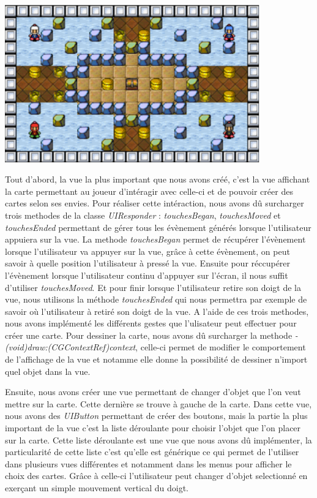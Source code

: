 		\begin{center}
			\includegraphics[width=11cm]{./Developpement/Img/carte.eps}
		\end{center}
		Tout d'abord, la vue la plus important que nous avons créé, c'est la vue affichant la carte permettant au joueur d'intéragir avec celle-ci et de pouvoir créer des cartes selon ses envies. Pour réaliser cette intéraction, nous avons dû surcharger trois methodes de la classe \textit{UIResponder} : \textit{touchesBegan}, \textit{touchesMoved} et \textit{touchesEnded} permettant de gérer tous les évènement générés lorsque l'utilisateur appuiera sur la vue. La methode \textit{touchesBegan} permet de récupérer l'évènement lorsque l'utilisateur va appuyer sur la vue, grâce à cette évènement, on peut savoir à quelle position l'utilisateur à pressé la vue. Ensuite pour réccupérer l'évènement lorsque l'utilisateur continu d'appuyer sur l'écran, il nous suffit d'utiliser \textit{touchesMoved}. Et pour finir lorsque l'utilisateur retire son doigt de la vue, nous utilisons la méthode \textit{touchesEnded} qui nous permettra par exemple de savoir où l'utilisateur à retiré son doigt de la vue. A l'aide de ces trois methodes, nous avons implémenté les différents gestes que l'ulisateur peut effectuer pour créer une carte. Pour dessiner la carte, nous avons dû surcharger la methode \textit{- (void)draw:(CGContextRef)context}, celle-ci permet de modifier le comportement de l'affichage de la vue et notamme elle donne la possibilité de dessiner n'import quel objet dans la vue.
		
		\begin{center}
		\end{center}
			
		Ensuite, nous avons créer une vue permettant de changer d'objet que l'on veut mettre sur la carte. Cette dernière se trouve à gauche de la carte. Dans cette vue, nous avons des \textit{UIButton} permettant de créer des boutons, mais la partie la plus important de la vue c'est la liste déroulante pour choisir l'objet que l'on placer sur la carte. Cette liste déroulante est une vue que nous avons dû implémenter, la particularité de cette liste c'est qu'elle est générique ce qui permet de l'utiliser dans plusieurs vues différentes et notamment dans les menus pour afficher le choix des cartes. Grâce à celle-ci l'utilisateur peut changer d'objet selectionné en exerçant un simple mouvement vertical du doigt.
			
